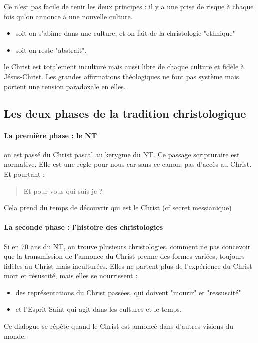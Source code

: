     
    Ce n'est pas facile de tenir les deux principes : il y a une prise de risque à chaque fois qu'on annonce à une nouvelle culture.
    \begin{itemize}
        \item soit on s'abime dans une culture, et on fait de la christologie "ethnique"
        \item soit on reste "abstrait".
    \end{itemize}
    
    
    \begin{Synthesis}
    le Christ est totalement inculturé mais aussi libre de chaque culture et fidèle à Jésus-Christ.
    Les grandes affirmations théologiques ne font pas système mais portent une tension paradoxale en elles.
    \end{Synthesis}

    
    \subsection{Les deux phases de la tradition christologique}
    

    
      
      \paragraph{La première phase : le NT}
      
      on est passé du Christ pascal au kerygme du NT. Ce passage scripturaire est normative. Elle est une règle pour nous car sans ce canon, pas d'accès au Christ.
      Et pourtant : 
      \begin{quote}
          Et pour vous qui suis-je ?
      \end{quote}
    
    Cela prend du temps de découvrir qui est le Christ (cf secret messianique)
      
      \paragraph{La seconde phase : l'histoire des christologies}
      
      Si en 70 ans du NT, on trouve plusieurs christologies,  comment ne pas concevoir que la transmission de l'annonce du Christ prenne des formes variées, toujours fidèles au Christ mais inculturées.
      Elles ne partent plus de l'expérience du Christ mort et résuscité, mais elles se nourrissent : 
      \begin{itemize}
          \item des représentations du Christ passées, qui doivent "mourir" et "ressuscité"
          \item et l'Esprit Saint qui agit dans les cultures et le temps.
      \end{itemize}
      Ce dialogue se répète quand le Christ est annoncé dans d'autres visions du monde. 
    
